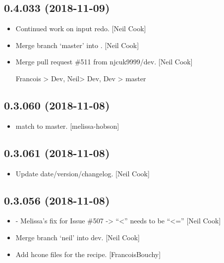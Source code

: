 \documentclass[a4paper,10pt,english]{report}
\begin{document}
\subsection{0.4.033 (2018-11-09)}
\label{\detokenize{misc/changelog:id262}}\begin{itemize}
\item {} 
Continued work on input redo. {[}Neil Cook{]}

\item {} 
Merge branch ‘master’ into . {[}Neil Cook{]}

\item {} 
Merge pull request \#511 from njcuk9999/dev. {[}Neil Cook{]}

Francois \textendash{}\textgreater{} Dev, Neil\textendash{}\textgreater{} Dev, Dev \textendash{}\textgreater{} master

\end{itemize}


\subsection{0.3.060 (2018-11-08)}
\label{\detokenize{misc/changelog:id263}}\begin{itemize}
\item {} 
 match to master. {[}melissa-hobson{]}

\end{itemize}


\subsection{0.3.061 (2018-11-08)}
\label{\detokenize{misc/changelog:id264}}\begin{itemize}
\item {} 
Update date/version/changelog. {[}Neil Cook{]}

\end{itemize}


\subsection{0.3.056 (2018-11-08)}
\label{\detokenize{misc/changelog:id265}}\begin{itemize}
\item {} 
 - Melissa’s fix for Issue \#507 -\textgreater{}   “\textless{}” needs to be “\textless{}=”
{[}Neil Cook{]}

\item {} 
Merge branch ‘neil’ into dev. {[}Neil Cook{]}

\item {} 
Add hcone files for the  recipe. {[}FrancoisBouchy{]}

\end{itemize}
\end{document}
